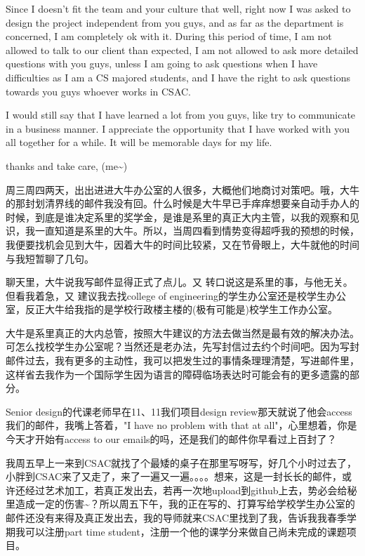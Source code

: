 \documentclass[12pt]{book}
\begin{document}
Since I doesn't fit the team and your culture that well, right now I was asked to design the project independent from you guys, and as far as the department is concerned, I am completely ok with it. During this period of time, I am not allowed to talk to our client than expected, I am not allowed to ask more detailed questions with you guys, unless I am going to ask questions when I have difficulties as I am a CS majored students, and I have the right to ask questions towards you guys whoever works in CSAC.

I would still say that I have learned a lot from you guys, like try to communicate in a business manner. I appreciate the opportunity that I have worked with you all together for a while. It will be memorable days for my life. 

thanks and take care, 
(me\textasciitilde{}) 

周三周四两天，出出进进大牛办公室的人很多，大概他们地商讨对策吧。哦，大牛的那封划清界线的邮件我没有回。什么时候是大牛早已手痒痒想要亲自动手办人的时候，到底是谁决定系里的奖学金，是谁是系里的真正大内主管，以我的观察和见识，我一直知道是系里的大牛。所以，当周四看到情势变得超呼我的预想的时候，我便要找机会见到大牛，因着大牛的时间比较紧，又在节骨眼上，大牛就他的时间与我短暂聊了几句。

聊天里，大牛说我写邮件显得正式了点儿。又 转口说这是系里的事，与他无关。但看我着急，又 建议我去找college of engineering的学生办公室还是校学生办公室，反正大牛给我指的是学校行政楼主楼的(极有可能是)校学生工作办公室。

大牛是系里真正的大内总管，按照大牛建议的方法去做当然是最有效的解决办法。可怎么找校学生办公室呢？当然还是老办法，先写封信过去约个时间吧。因为写封邮件过去，我有更多的主动性，我可以把发生过的事情条理理清楚，写进邮件里，这样省去我作为一个国际学生因为语言的障碍临场表达时可能会有的更多遗露的部分。

Senior design的代课老师早在11、11我们项目design review那天就说了他会access我们的邮件，我嘴上答着，"I have no problem with that at all"，心里想着，你是今天才开始有access  to our emails的吗，还是我们的邮件你早看过上百封了？ 

我周五早上一来到CSAC就找了个最矮的桌子在那里写呀写，好几个小时过去了，小胖到CSAC来了又走了，来了一遍又一遍。。。。想来，这是一封长长的邮件，或许还经过艺术加工，若真正发出去，若再一次地upload到github上去，势必会给秘里造成一定的伤害\textasciitilde{}？所以周五下午，我的正在写的、打算写给学校学生办公室的邮件还没有来得及真正发出去，我的导师就来CSAC里找到了我，告诉我我春季学期我可以注册part time student，注册一个他的课学分来做自己尚未完成的课题项目。
\end{document}
